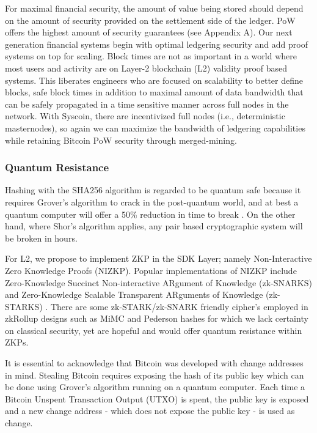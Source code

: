 \documentclass[peerreview]{ieeesyscoin}
\begin{document}
For maximal financial security, the amount of value being stored should depend on the amount of security provided on the settlement side of the ledger. PoW offers the highest amount of security guarantees (see Appendix A). Our next generation financial systems begin with optimal ledgering security and add proof systems on top for scaling. Block times are not as important in a world where most users and activity are on Layer-2 blockchain (L2) validity proof based systems. This liberates engineers who are focused on scalability to better define blocks, safe block times in addition to  maximal amount of data bandwidth that can be safely propagated in a time sensitive manner across full nodes in the network. With Syscoin, there are incentivized full nodes (i.e., deterministic masternodes), so again we can maximize the bandwidth of ledgering capabilities while retaining Bitcoin PoW security through merged-mining.


\subsubsection{Quantum Resistance}

Hashing with the SHA256 algorithm is regarded to be quantum safe because it requires Grover's algorithm to crack in the post-quantum world, and at best a quantum computer will offer a 50\% reduction in time to break \cite{Nai19}. On the other hand, where Shor’s algorithm applies, any pair based cryptographic system will be broken in hours.

For L2, we propose to implement ZKP in the SDK Layer; namely Non-Interactive Zero Knowledge Proofs (NIZKP). Popular implementations of NIZKP include Zero-Knowledge Succinct Non-interactive ARgument of Knowledge (zk-SNARKS) and Zero-Knowledge Scalable Transparent ARguments of Knowledge (zk-STARKS) \cite{Nas19}. There are some zk-STARK/zk-SNARK friendly cipher’s employed in zkRollup designs such as MiMC and Pederson hashes for which we lack certainty on classical security, yet are hopeful and would offer quantum resistance within ZKPs.

It is essential to acknowledge that Bitcoin was developed with change addresses in mind. Stealing Bitcoin requires exposing the hash of its public key which can be done using Grover’s algorithm running on a quantum computer. Each time a Bitcoin Unspent Transaction Output (UTXO) is spent, the public key is exposed and a new change address - which does not expose the public key - is used as change.
\end{document}
